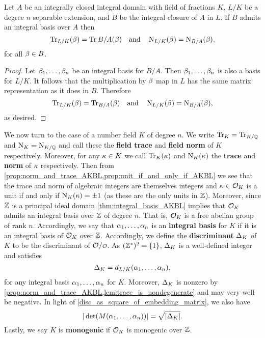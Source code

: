     \begin{proposition}\label{prop:trace_and_norm_reduce_for_integral_basis}
      Let $A$ be an integrally closed integral domain with field of fractions $K$, $L/K$ be a degree $n$ separable extension, and $B$ be the integral closure of $A$ in $L$. If $B$ admits an integral basis over $A$ then
      \[
        \operatorname{\mathrm{Tr}}_{L/K}(\beta) = \operatorname{\mathrm{Tr}}{B/A}(\beta) \quad \text{and} \quad \operatorname{\mathrm{N}}_{L/K}(\beta) = \operatorname{\mathrm{N}}_{B/A}(\beta),
      \]
      for all $\beta \in B$.
    \end{proposition}
    \begin{proof}
      Let $\beta_{1},\ldots,\beta_{n}$ be an integral basis for $B/A$. Then $\beta_{1},\ldots,\beta_{n}$ is also a basis for $L/K$. It follows that the multiplication by $\beta$ map in $L$ has the same matrix representation as it does in $B$. Therefore
      \[
        \operatorname{\mathrm{Tr}}_{L/K}(\beta) = \operatorname{\mathrm{Tr}}_{B/A}(\beta) \quad \text{and} \quad \operatorname{\mathrm{N}}_{L/K}(\beta) = \operatorname{\mathrm{N}}_{B/A}(\beta),
      \]
      as desired.
    \end{proof}

    We now turn to the case of a number field $K$ of degree $n$. We write $\operatorname{\mathrm{Tr}}_{K} = \operatorname{\mathrm{Tr}}_{K/\mathbb{Q}}$ and $\operatorname{\mathrm{N}}_{K} = \operatorname{\mathrm{N}}_{K/\mathbb{Q}}$ and call these the \textbf{field trace} and \textbf{field norm} of $K$ respectively. Moreover, for any $\kappa \in K$ we call $\operatorname{\mathrm{Tr}}_{K}(\kappa)$ and $\operatorname{\mathrm{N}}_{K}(\kappa)$ the \textbf{trace} and \textbf{norm} of $\kappa$ respectively. Then from \cref{prop:norm_and_trace_AKBL,prop:unit_if_and_only_if_AKBL} we see that the trace and norm of algebraic integers are themselves integers and $\kappa \in \mathcal{O}_{K}$ is a unit if and only if $\operatorname{\mathrm{N}}_{K}(\kappa) = \pm 1$ (as these are the only units in $\mathbb{Z}$). Moreover, since $\mathbb{Z}$ is a principal ideal domain \cref{thm:integral_basis_AKBL} implies that $\mathcal{O}_{K}$ admits an integral basis over $\mathbb{Z}$ of degree $n$. That is, $\mathcal{O}_{K}$ is a free abelian group of rank $n$. Accordingly, we say that $\alpha_{1},\ldots,\alpha_{n}$ is an \textbf{integral basis} for $K$ if it is an integral basis of $\mathcal{O}_{K}$ over $\mathbb{Z}$. Accordingly, we define the \textbf{discriminant} $\Delta_{K}$ of $K$ to be the discriminant of $\mc{O}/\smc{O}$. As $(\mathbb{Z}^{\ast})^{2} = \{1\}$, $\Delta_{K}$ is a well-defined integer and satisfies
    \[
      \Delta_{K} = d_{L/K}(\alpha_{1},\ldots,\alpha_{n}),
    \]
    for any integral basis $\alpha_{1},\ldots,\alpha_{n}$ for $K$. Moreover, $\Delta_{K}$ is nonzero by \cref{prop:norm_and_trace_AKBL,lem:trace_is_nondegenerate} and may very well be negative. In light of \cref{disc_as_square_of_embedding_matrix}, we also have
    \[
      |\det(M(\alpha_{1},\ldots,\alpha_{n}))| = \sqrt{|\Delta_{K}|}.
    \]
    Lastly, we say $K$ is \textbf{monogenic} if $\mathcal{O}_{K}$ is monogenic over $\mathbb{Z}$.
